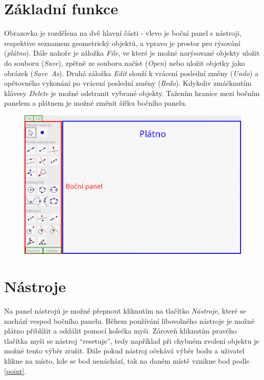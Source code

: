 \documentclass[11pt]{article}
\begin{document}
    \section{Základní funkce}
    Obrazovka je rozdělena na dvě hlavní části - vlevo je boční panel s nástroji, respektive seznamem geometrický objektů, a vpravo je prostor pro rýsování (\textit{plátno}). Dále nahoře je záložka \textit{File}, ve které je možné narýsované objekty uložit do souboru (\textit{Save}), zpětně ze souboru načíst (\textit{Open}) nebo uložit objetky jako obrázek (\textit{Save~As}). Druhá záložka \textit{Edit} slouží k vrácení poslední změny (\textit{Undo}) a opětovného vykonání po vrácení poslední změny (\textit{Redo}). Kdykoliv zmáčknutím klávesy \textit{Delete} je možné odstranit vybrané objekty. Tažením hranice mezi bočním panelem a plátnem je možné změnit šířku bočního panelu.
    \begin{figure}[h]
        \begin{center}
        \includegraphics[scale=0.4]{imgs/overview.png}
        \end{center}
    \end{figure}
    \section{Nástroje}
    Na panel nástrojů je možné přepnout kliknutím na tlačítko \textit{Nástroje}, které se nachází vespod bočního panelu. Během používání libovolného nástroje je možné plátno přiblížit a oddálit pomocí kolečka myši. Zároveň kliknutím pravého tlačítka myši se nástroj \enquote{resetuje}, tedy například při chybném zvolení objektu je možné tento výběr zrušit. Dále pokud nástroj očekává výběr bodu a uživatel klikne na místo, kde se bod nenáchází, tak na daném místě vznikne bod podle \ref{point}.
\end{document}
